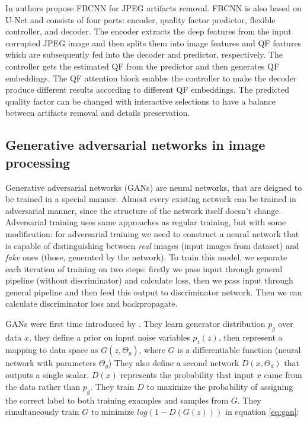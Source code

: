 In \cite{jiang_towards_2021} authors propose FBCNN for JPEG artifacts removal. FBCNN is also based on U-Net \cite{ronneberger_u-net_2015} and consists of four parts: encoder, quality factor predictor, flexible controller, and decoder. The encoder extracts the deep features from the input corrupted JPEG image and then splits them into image features and QF features which are subsequently fed into the decoder and predictor, respectively. The controller gets the estimated QF from the predictor and then generates QF embeddings. The QF attention block enables the controller to make the decoder produce different results according to different QF embeddings. The predicted quality factor can be changed with interactive selections to have a balance between artifacts removal and details preservation.

\subsection{Generative adversarial networks in image processing}

Generative adversarial networks (GANs) are neural networks, that are deigned to be trained in a special manner. Almost every existing network can be trained in adversarial manner, since the structure of the network itself doesn't change. Adversarial training uses same approaches as regular training, but with some modification: for adversarial training we need to construct a neural network that is capable of distinguishing between \textit{real} images (input images from dataset) and \textit{fake} ones (those, generated by the network). To train this model, we separate each iteration of training on two steps: firstly we pass input through general pipeline (without discriminator) and calculate loss, then we pass input through general pipeline and then feed this output to discriminator network. Then we can calculate discriminator loss and backpropagate.

GANs were first time introduced by \cite{Goodfellow_Pouget-Abadie_Mirza_Xu_Warde-Farley_Ozair_Courville_Bengio_2014}. They learn generator distribution $p_g$ over data $x$, they define a prior on input noise variables $p_z(z)$, then represent a mapping to data space as $G(z, \Theta_g)$, where $G$ is a differentiable function (neural network with parameters $\Theta_g$) They also define a second network $D(x, \Theta_d)$ that outputs a single scalar. $D(x)$ represents the probability that input $x$ came from the data rather than $p_g$. They train $D$ to maximize the probability of assigning the correct label to both training examples and samples from $G$. They simultaneously train $G$ to minimize $log(1 − D(G(z)))$ in equation \ref{eq:gan}:

